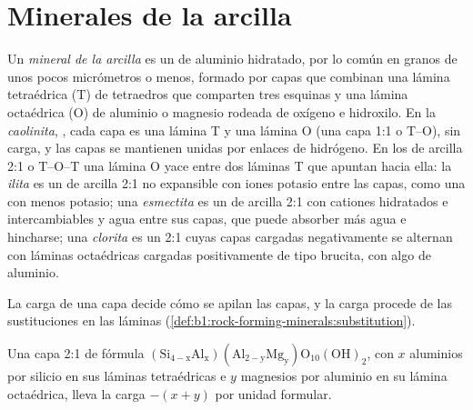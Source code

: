 \section{Minerales de la arcilla}\label{sec:b1:weathering-clays:clays}

\begin{definition}\label{def:b1:weathering-clays:clay-mineral}
Un \emph{mineral de la arcilla} es un  de aluminio hidratado, por lo común en granos de unos pocos micrómetros
o menos, formado por capas que combinan una lámina tetraédrica (T) de tetraedros  que comparten tres esquinas y una lámina octaédrica (O)
de aluminio o magnesio rodeada de oxígeno e hidroxilo. En la \emph{caolinita}, , cada capa es una lámina T y una lámina O
(una capa 1:1 o T--O), sin carga, y las capas se mantienen unidas por enlaces de hidrógeno. En los  de arcilla 2:1 o T--O--T una lámina O yace
entre dos láminas T que apuntan hacia ella: la \emph{ilita} es un  de arcilla 2:1 no expansible con iones potasio entre las capas, como una  con
menos potasio; una \emph{esmectita} es un  de arcilla 2:1 con cationes hidratados e intercambiables y agua entre sus capas, que puede
absorber más agua e hincharse; una \emph{clorita} es un  2:1 cuyas capas cargadas negativamente se alternan con láminas octaédricas
cargadas positivamente de tipo brucita,  con algo de aluminio.
\end{definition}

La carga de una capa decide cómo se apilan las capas, y la carga procede de las sustituciones en las láminas (\cref{def:b1:rock-forming-minerals:substitution}).

\begin{proposition}\label{prop:b1:weathering-clays:layer-charge}
Una capa 2:1 de fórmula $\mathrm{(Si_{4-x}Al_x)(Al_{2-y}Mg_y)O_{10}(OH)_2}$, con
$x$ aluminios por silicio en sus láminas tetraédricas e $y$ magnesios por
aluminio en su lámina octaédrica, lleva la carga $-(x + y)$ por unidad formular.
\end{proposition}

